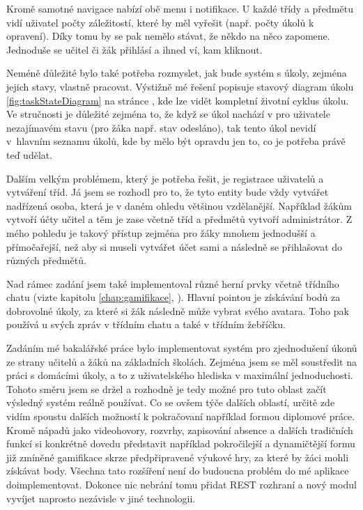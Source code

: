 \documentclass[twoside]{ctuthesis}
\theoremstyle{plain}
\theoremstyle{definition}
\theoremstyle{note}
\begin{document}
Kromě samotné navigace nabízí obě menu i notifikace. U každé třídy a předmětu vidí uživatel počty záležitostí, které by měl vyřešit (např. počty úkolů k opravení). Díky tomu by se pak nemělo stávat, že někdo na něco zapomene. Jednoduše se učitel či žák přihlásí a ihned ví, kam kliknout.

Neméně důležité bylo také potřeba rozmyslet, jak bude systém s úkoly, zejména jejich stavy, vlastně pracovat. Výstižně mé řešení popisuje stavový diagram úkolu \ref{fig:taskStateDiagram} na stránce \pageref{fig:taskStateDiagram}, kde lze vidět kompletní životní cyklus úkolu. Ve stručnosti je důležité zejména to, že když se úkol nachází v pro uživatele nezajímavém stavu (pro žáka např. stav odesláno), tak tento úkol nevidí v~hlavním seznamu úkolů, kde by mělo být opravdu jen to, co je potřeba právě teď udělat.

Dalším velkým problémem, který je potřeba řešit, je registrace uživatelů a vytváření tříd. Já jsem se rozhodl pro to, že tyto entity bude vždy vytvářet nadřízená osoba, která je v daném ohledu většinou vzdělanější. Například žákům vytvoří účty učitel a těm je zase včetně tříd a předmětů vytvoří administrátor. Z mého pohledu je takový přístup zejména pro žáky mnohem jednodušší a přímočařejší, než aby si museli vytvářet účet sami a následně se přihlašovat do různých předmětů.

Nad rámec zadání jsem také implementoval různé herní prvky včetně třídního chatu (vizte kapitolu \ref{chap:gamifikace}, ). Hlavní pointou je získávání bodů za dobrovolné úkoly, za které si žák následně může vybrat svého avatara. Toho pak používá u svých zpráv v třídním chatu a také v třídním žebříčku.

Zadáním mé bakalářské práce bylo implementovat systém pro zjednodušení úkonů ze strany učitelů a žáků na základních školách. Zejména jsem se měl soustředit na práci s domácími úkoly, a to z uživatelského hlediska v maximální jednoduchosti. Tohoto směru jsem se držel a rozhodně je tedy možné pro tuto oblast začít výsledný systém reálně používat. Co se ovšem týče dalších oblastí, určitě zde vidím spoustu dalších možností k pokračovaní například formou diplomové práce. Kromě nápadů jako videohovory, rozvrhy, zapisování absence a dalších tradičních funkcí si konkrétně dovedu představit například pokročilejší a dynamičtější formu již zmíněné gamifikace skrze předpřipravené výukové hry, za které by žáci mohli získávat body. Všechna tato rozšíření není do budoucna problém do mé aplikace doimplementovat. Dokonce nic nebrání tomu přidat REST rozhraní a nový modul vyvíjet naprosto nezávisle v jiné technologii.
\end{document}
